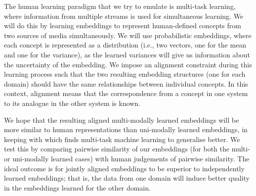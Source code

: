 The human learning paradigm that we try to emulate is multi-task learning, where information from multiple streams is used for simultaneous learning. We will do this by learning embeddings to represent human-defined concepts from two sources of media simultaneously. We will use probabilistic embeddings, where each concept is represented as a distribution (i.e., two vectors, one for the mean and one for the variance), as the learned variances will give us information about the uncertainty of the embedding. We impose an alignment constraint during this learning process such that the two resulting embedding structures (one for each domain) should have the same relationships between individual concepts. In this context, alignment means that the correspondence from a concept in one system to its analogue in the other system is known. 





We hope that the resulting aligned multi-modally learned embeddings will be more similar to human representations than uni-modally learned embeddings, in keeping with \cite{OverviewMultiTaskLearning} which finds multi-task machine learning to generalise better. We test this by comparing pairwise similarity of our embeddings (for both the multi- or uni-modally learned cases) with human judgements of pairwise similarity. The ideal outcome is for jointly aligned embeddings to be superior to independently learned embeddings; that is, the data from one domain will induce better quality in the embeddings learned for the other domain. 

